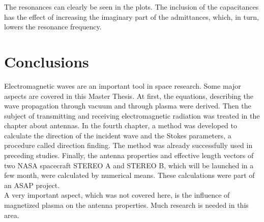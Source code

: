 \documentclass[a4paper,14pt]{extbook}
\begin{document}
The resonances can clearly be seen in the plots. The inclusion of the capacitances has the effect of increasing the imaginary part of the admittances, which, in turn, lowers the resonance frequency.


\chapter{Conclusions}

Electromagnetic waves are an important tool in space research. Some major aspects are covered in this Master Thesis. At first, the equations, describing the wave propagation through vacuum and through plasma were derived. Then the subject of transmitting and receiving electromagnetic radiation was treated in the chapter about antennas. In the fourth chapter, a method was developed to calculate the direction of the incident wave and the Stokes parameters, a procedure called direction finding. The method was already successfully used in preceding studies. Finally, the antenna properties and effective length vectors of two NASA spacecraft STEREO A and STEREO B, which will be launched in a few month, were calculated by numerical means. These calculations were part of an ASAP project.\\

A very important aspect, which was not covered here, is the influence of magnetized plasma on the antenna properties. Much research is needed in this area.\\
\end{document}
